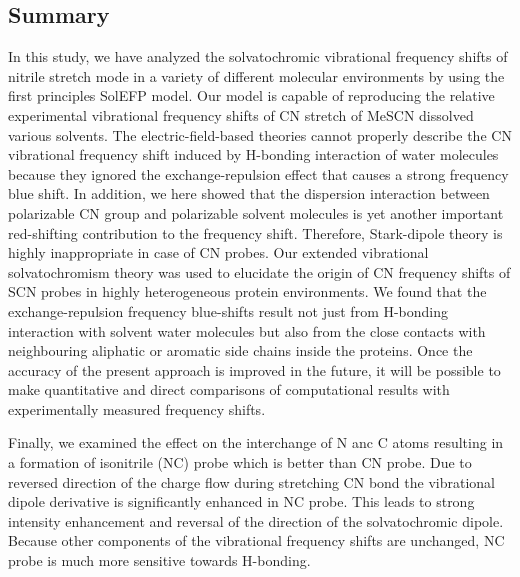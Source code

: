 \documentclass[a4paper,titlepage,twoside,fleqn,12pt]{book}
\begin{document}
\begin{refsection}
\section{Summary}

In this study, we have analyzed the solvatochromic vibrational
frequency shifts of nitrile stretch mode in a variety of different
molecular environments by using the first principles SolEFP
model. Our model is
capable of reproducing the relative experimental vibrational
frequency shifts of CN stretch of MeSCN dissolved various solvents. 
The
electric\hyp{}field\hyp{}based theories cannot properly describe the CN
vibrational frequency shift induced by H-bonding interaction of
water molecules because they ignored the exchange\hyp{}repulsion
effect that causes a strong frequency blue shift.
In addition, we here showed that the dispersion interaction
between polarizable CN group and polarizable solvent
molecules is yet another important red\hyp{}shifting contribution to
the frequency shift. Therefore, Stark\hyp{}dipole
theory is highly inappropriate in case of CN probes. 
Our extended vibrational solvatochromism
theory was used to elucidate the origin of CN frequency shifts
of SCN probes in highly heterogeneous protein environments. We found that 
the exchange\hyp{}repulsion frequency
blue\hyp{}shifts result not just from H-bonding interaction with
solvent water molecules but also from the close contacts with
neighbouring aliphatic or aromatic side chains inside the
proteins. Once the accuracy of the present
approach is improved in the future, it will be possible to make
quantitative and direct comparisons of computational results
with experimentally measured frequency shifts. 

Finally, we examined the effect on the interchange of N anc C
atoms resulting in a formation of isonitrile (NC) probe
which is better than CN probe. Due to reversed direction
of the charge flow during stretching CN bond the vibrational
dipole derivative is significantly enhanced in NC probe.
This leads to strong intensity enhancement and reversal
of the direction of the solvatochromic dipole. Because other
components of the vibrational frequency shifts are unchanged,
NC probe is much more sensitive towards H-bonding.

\printbibliography[heading=subbibintoc,title={References}]
\end{refsection}

\end{document}
